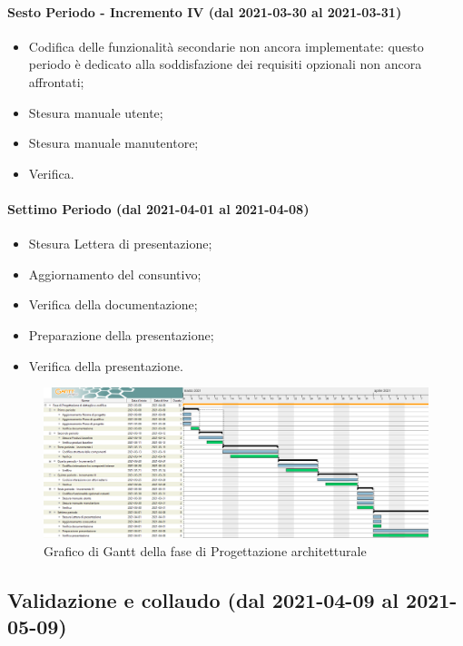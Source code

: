 \paragraph{Sesto Periodo - Incremento IV (dal 2021-03-30 al 2021-03-31)}
\begin{itemize}
	\item Codifica delle funzionalità secondarie non ancora implementate: questo periodo è dedicato alla soddisfazione dei requisiti opzionali non ancora affrontati;
	\item Stesura manuale utente;
	\item Stesura manuale manutentore;
	\item Verifica.
\end{itemize}

\paragraph{Settimo Periodo (dal 2021-04-01 al 2021-04-08)}
\begin{itemize}
	\item Stesura Lettera di presentazione;
	\item Aggiornamento del consuntivo;
	\item Verifica della documentazione;
	\item Preparazione della presentazione;
	\item Verifica della presentazione.
\end{itemize}

\begin{landscape}
	\begin{figure}[H]
		\centering
		\includegraphics[width=\linewidth]{res/images/ganttFase3.png}
		\caption{Grafico di Gantt della fase di Progettazione architetturale}
		\label{fig:Gantt Analisi dei requisiti}
	\end{figure}
\end{landscape}

\subsection{Validazione e collaudo (dal 2021-04-09 al 2021-05-09)}

